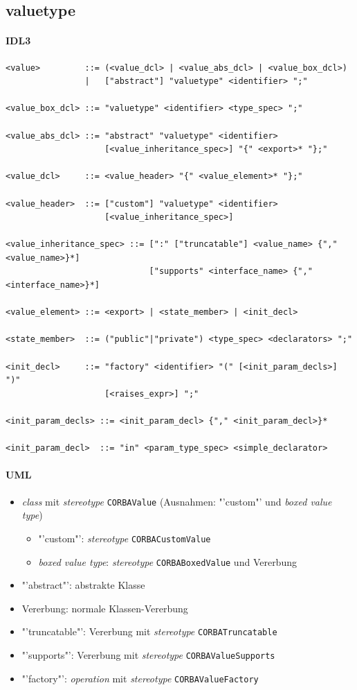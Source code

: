 \documentclass [a4paper,10pt] {scrartcl}
\begin{document}
\cleardoublepage
\subsection{valuetype}
\label{sec:valuetype}
\paragraph{IDL3}
\begin{verbatim}
<value>         ::= (<value_dcl> | <value_abs_dcl> | <value_box_dcl>)
                |   ["abstract"] "valuetype" <identifier> ";"

<value_box_dcl> ::= "valuetype" <identifier> <type_spec> ";"

<value_abs_dcl> ::= "abstract" "valuetype" <identifier>
                    [<value_inheritance_spec>] "{" <export>* "};"

<value_dcl>     ::= <value_header> "{" <value_element>* "};"

<value_header>  ::= ["custom"] "valuetype" <identifier>
                    [<value_inheritance_spec>]

<value_inheritance_spec> ::= [":" ["truncatable"] <value_name> {"," <value_name>}*]
                             ["supports" <interface_name> {"," <interface_name>}*]

<value_element> ::= <export> | <state_member> | <init_decl>

<state_member>  ::= ("public"|"private") <type_spec> <declarators> ";"

<init_decl>     ::= "factory" <identifier> "(" [<init_param_decls>] ")"
                    [<raises_expr>] ";"

<init_param_decls> ::= <init_param_decl> {"," <init_param_decl>}*

<init_param_decl>  ::= "in" <param_type_spec> <simple_declarator>
\end{verbatim}
\paragraph{UML}
\begin{itemize}
\item \emph{class} mit \emph{stereotype} \texttt{CORBAValue}
(Ausnahmen: "'custom"' und \emph{boxed value type})
    \begin{itemize}
    \item "'custom"': \emph{stereotype} \texttt{CORBACustomValue}
    \item \emph{boxed value type}: \emph{stereotype} \texttt{CORBABoxedValue} und Vererbung
    \end{itemize}
\item "'abstract"': abstrakte Klasse
\item Vererbung: normale Klassen-Vererbung
\item "'truncatable"': Vererbung mit \emph{stereotype} \texttt{CORBATruncatable}
\item "'supports"': Vererbung mit \emph{stereotype} \texttt{CORBAValueSupports}
\item "'factory"': \emph{operation} mit \emph{stereotype} \texttt{CORBAValueFactory}
\end{itemize}
\end{document}
